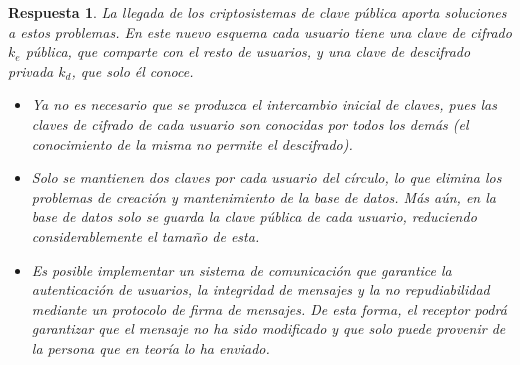 \documentclass[
  a4paper,
  spanish,
  12pt,
]{scrartcl}
\theoremstyle{ejercicio-style}
\theoremstyle{remark-style}
\newtheorem*{sol}{Respuesta}
\theoremstyle{teorema-style}
\begin{document}
\begin{sol}
La llegada de los criptosistemas de clave pública aporta soluciones a estos problemas. En este nuevo esquema cada usuario tiene una clave de cifrado $k_e$ pública, que comparte con el resto de usuarios, y una clave de descifrado privada $k_d$, que solo él conoce.

\begin{itemize}
  \item Ya no es necesario que se produzca el intercambio inicial de claves, pues las claves de cifrado de cada usuario son conocidas por todos los demás (el conocimiento de la misma no permite el descifrado).

  \item Solo se mantienen dos claves por cada usuario del círculo, lo que elimina los problemas de creación y mantenimiento de la base de datos. Más aún, en la base de datos solo se guarda la clave pública de cada usuario, reduciendo considerablemente el tamaño de esta.

\item Es posible implementar un sistema de comunicación que garantice la \textit{autenticación} de usuarios, la \textit{integridad} de mensajes y la \textit{no repudiabilidad} mediante un protocolo de firma de mensajes. De esta forma, el receptor podrá garantizar que el mensaje no ha sido modificado y que solo puede provenir de la persona que en teoría lo ha enviado.

\end{itemize}
\end{sol}
\end{document}
